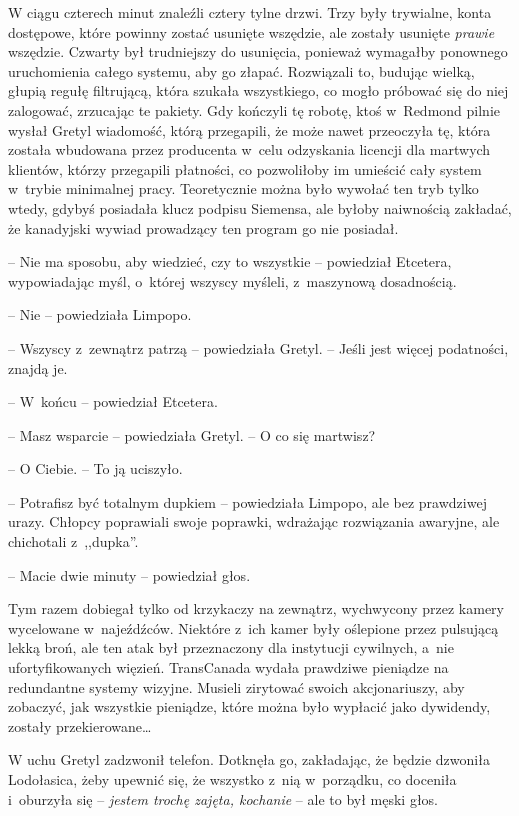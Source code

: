 \documentclass[oneside,polish,11pt,sfheadings]{mwbk}
\begin{document}
W ciągu czterech minut znaleźli cztery tylne drzwi. Trzy były trywialne,
konta dostępowe, które powinny zostać usunięte wszędzie, ale zostały
usunięte \textit{prawie} wszędzie. Czwarty był trudniejszy do usunięcia,
ponieważ wymagałby ponownego uruchomienia całego systemu, aby go złapać.
Rozwiązali to, budując wielką, głupią regułę filtrującą, która szukała
wszystkiego, co mogło próbować się do niej zalogować, zrzucając te
pakiety. Gdy kończyli tę robotę, ktoś w~Redmond pilnie wysłał Gretyl
wiadomość, którą przegapili, że może nawet przeoczyła tę, która została
wbudowana przez producenta w~celu odzyskania licencji dla martwych
klientów, którzy przegapili płatności, co pozwoliłoby im umieścić cały
system w~trybie minimalnej pracy. Teoretycznie można było wywołać ten
tryb tylko wtedy, gdybyś posiadała klucz podpisu Siemensa, ale byłoby
naiwnością zakładać, że kanadyjski wywiad prowadzący ten program go nie
posiadał.

-- Nie ma sposobu, aby wiedzieć, czy to wszystkie -- powiedział Etcetera,
wypowiadając myśl, o~której wszyscy myśleli, z~maszynową dosadnością.

-- Nie -- powiedziała Limpopo.

-- Wszyscy z~zewnątrz patrzą -- powiedziała Gretyl. -- Jeśli jest więcej
podatności, znajdą je.

-- W~końcu -- powiedział Etcetera.

-- Masz wsparcie -- powiedziała Gretyl. -- O co się martwisz?

-- O Ciebie. -- To ją uciszyło.

-- Potrafisz być totalnym dupkiem -- powiedziała Limpopo, ale bez
prawdziwej urazy. Chłopcy poprawiali swoje poprawki, wdrażając
rozwiązania awaryjne, ale chichotali z~,,dupka''.

-- Macie dwie minuty -- powiedział głos. 

Tym razem dobiegał tylko od
krzykaczy na zewnątrz, wychwycony przez kamery wycelowane w~najeźdźców.
Niektóre z~ich kamer były oślepione przez pulsującą lekką broń, ale ten
atak był przeznaczony dla instytucji cywilnych, a~nie ufortyfikowanych
więzień. TransCanada wydała prawdziwe pieniądze na redundantne systemy
wizyjne. Musieli zirytować swoich akcjonariuszy, aby zobaczyć, jak
wszystkie pieniądze, które można było wypłacić jako dywidendy, zostały
przekierowane\ldots 

W uchu Gretyl zadzwonił telefon. Dotknęła go, zakładając, że będzie
dzwoniła Lodołasica, żeby upewnić się, że wszystko z~nią w~porządku, co
doceniła i~oburzyła się -- \textit{jestem trochę zajęta, kochanie} -- ale to
był męski głos.
\end{document}
